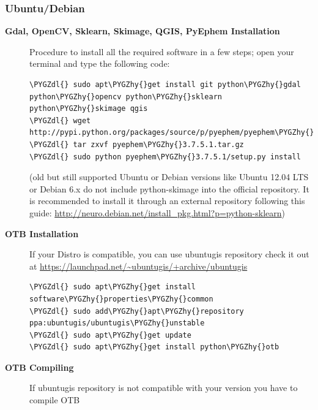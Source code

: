\documentclass[letterpaper,10pt,english]{sphinxmanual}
\def\PYGZdl{\char`\$}
\def\PYGZhy{\char`\-}
\begin{document}
\subsubsection{Ubuntu/Debian}
\label{install:ubuntu-debian}\begin{description}
\item[{\textbf{Gdal, OpenCV, Sklearn, Skimage, QGIS, PyEphem Installation}}] \leavevmode
Procedure to install all the required software in a few steps; open your terminal and type the following code:

\begin{Verbatim}[frame=single,commandchars=\\\{\}]
\PYGZdl{} sudo apt\PYGZhy{}get install git python\PYGZhy{}gdal python\PYGZhy{}opencv python\PYGZhy{}sklearn python\PYGZhy{}skimage qgis
\PYGZdl{} wget http://pypi.python.org/packages/source/p/pyephem/pyephem\PYGZhy{}3.7.5.1.tar.gz
\PYGZdl{} tar zxvf pyephem\PYGZhy{}3.7.5.1.tar.gz
\PYGZdl{} sudo python pyephem\PYGZhy{}3.7.5.1/setup.py install
\end{Verbatim}

(old but still supported Ubuntu or Debian versions like Ubuntu 12.04 LTS or Debian 6.x do not include python-skimage into the official repository. It is recommended to install it through an external repository following this guide: \href{http://neuro.debian.net/install\_pkg.html?p=python-sklearn}{http://neuro.debian.net/install\_pkg.html?p=python-sklearn})

\item[{\textbf{OTB Installation}}] \leavevmode
If your Distro is compatible, you can use ubuntugis repository check it out at \href{https://launchpad.net/~ubuntugis/+archive/ubuntugis}{https://launchpad.net/\textasciitilde{}ubuntugis/+archive/ubuntugis}

\begin{Verbatim}[frame=single,commandchars=\\\{\}]
\PYGZdl{} sudo apt\PYGZhy{}get install software\PYGZhy{}properties\PYGZhy{}common
\PYGZdl{} sudo add\PYGZhy{}apt\PYGZhy{}repository ppa:ubuntugis/ubuntugis\PYGZhy{}unstable
\PYGZdl{} sudo apt\PYGZhy{}get update
\PYGZdl{} sudo apt\PYGZhy{}get install python\PYGZhy{}otb
\end{Verbatim}

\item[{\textbf{OTB Compiling}}] \leavevmode
If ubuntugis repository is not compatible with your version you have to compile OTB


\end{description}
\end{document}
